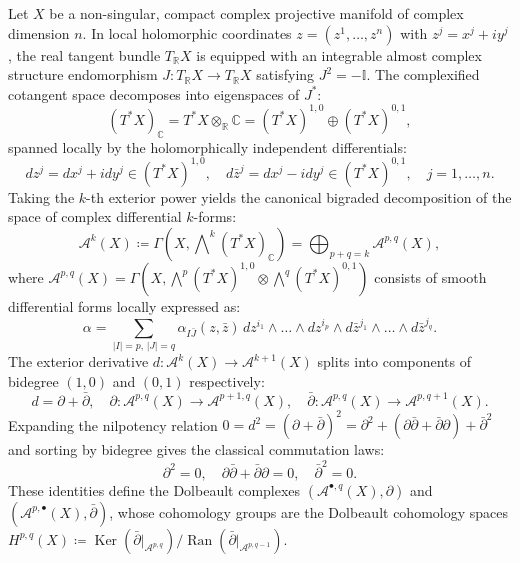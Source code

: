 \documentclass[11pt,a4paper]{article}
\theoremstyle{definition}
\theoremstyle{plain}
\DeclareMathOperator{\Ker}{Ker}
\DeclareMathOperator{\Ran}{Ran}
\begin{document}
Let $X$ be a non-singular, compact complex projective manifold of complex dimension $n$. In local holomorphic coordinates $z = (z^1, \dots, z^n)$ with $z^j = x^j + i y^j$, the real tangent bundle $T_\mathbb{R} X$ is equipped with an integrable almost complex structure endomorphism $J: T_\mathbb{R} X \to T_\mathbb{R} X$ satisfying $J^2 = -\mathbb{I}$. The complexified cotangent space decomposes into eigenspaces of $J^*$:
\begin{equation}
    \label{eq:cotangent_splitting}
    (T^* X)_\mathbb{C} = T^* X \otimes_\mathbb{R} \mathbb{C} = (T^* X)^{1,0} \oplus (T^* X)^{0,1},
\end{equation}
spanned locally by the holomorphically independent differentials:
\begin{equation}
    dz^j = dx^j + i dy^j \in (T^* X)^{1,0}, \quad d\bar{z}^j = dx^j - i dy^j \in (T^* X)^{0,1}, \quad j = 1, \dots, n.
\end{equation}
Taking the $k$-th exterior power yields the canonical bigraded decomposition of the space of complex differential $k$-forms:
\begin{equation}
    \label{eq:exterior_bigrading}
    \mathcal{A}^k(X) \coloneqq \Gamma\left( X, \bigwedge\nolimits^k (T^* X)_\mathbb{C} \right) = \bigoplus_{p+q=k} \mathcal{A}^{p,q}(X),
\end{equation}
where $\mathcal{A}^{p,q}(X) = \Gamma\left( X, \bigwedge^p (T^* X)^{1,0} \otimes \bigwedge^q (T^* X)^{0,1} \right)$ consists of smooth differential forms locally expressed as:
\begin{equation}
    \alpha = \sum_{|I|=p, \, |J|=q} \alpha_{I\bar{J}}(z, \bar{z}) \, dz^{i_1} \wedge \dots \wedge dz^{i_p} \wedge d\bar{z}^{j_1} \wedge \dots \wedge d\bar{z}^{j_q}.
\end{equation}
The exterior derivative $d: \mathcal{A}^k(X) \to \mathcal{A}^{k+1}(X)$ splits into components of bidegree $(1,0)$ and $(0,1)$ respectively:
\begin{equation}
    \label{eq:d_splitting}
    d = \partial + \bar{\partial}, \quad \partial: \mathcal{A}^{p,q}(X) \longrightarrow \mathcal{A}^{p+1,q}(X), \quad \bar{\partial}: \mathcal{A}^{p,q}(X) \longrightarrow \mathcal{A}^{p,q+1}(X).
\end{equation}
Expanding the nilpotency relation $0 = d^2 = (\partial + \bar{\partial})^2 = \partial^2 + (\partial\bar{\partial} + \bar{\partial}\partial) + \bar{\partial}^2$ and sorting by bidegree gives the classical commutation laws:
\begin{equation}
    \label{eq:dolbeault_nilpotency}
    \partial^2 = 0, \quad \partial\bar{\partial} + \bar{\partial}\partial = 0, \quad \bar{\partial}^2 = 0.
\end{equation}
These identities define the Dolbeault complexes $(\mathcal{A}^{\bullet, q}(X), \partial)$ and $(\mathcal{A}^{p, \bullet}(X), \bar{\partial})$, whose cohomology groups are the Dolbeault cohomology spaces $H^{p,q}(X) \coloneqq \Ker(\bar{\partial}|_{\mathcal{A}^{p,q}}) / \Ran(\bar{\partial}|_{\mathcal{A}^{p,q-1}})$.
\end{document}

